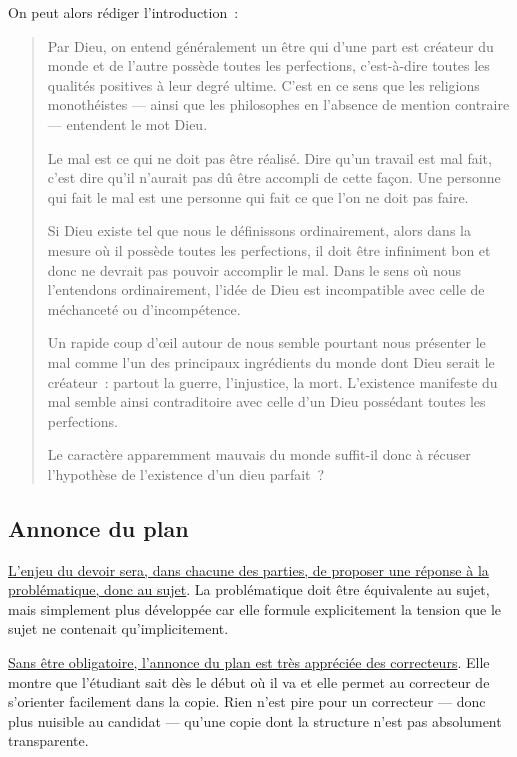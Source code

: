 \documentclass[a4paper,12pt]{article}
\begin{document}
\noindent On peut alors rédiger l'introduction :

\begin{quotation}
Par Dieu, on entend généralement un être qui
d'une part est créateur du monde et de l'autre possède toutes les
perfections, c'est-à-dire toutes les qualités positives à leur degré
ultime. C'est en ce sens que les religions monothéistes — ainsi que
les philosophes en l'absence de mention contraire — entendent le mot
Dieu.

Le mal est ce qui ne doit pas être réalisé. Dire qu'un travail est mal
fait, c'est dire qu'il n'aurait pas dû être accompli de cette façon.
Une personne qui fait le mal est une personne qui fait ce que l'on ne
doit pas faire. 

Si Dieu existe tel que nous le définissons
ordinairement, alors dans la mesure où il possède toutes les
perfections, il doit être infiniment bon et donc ne devrait pas
pouvoir accomplir le mal. Dans le sens où nous l'entendons
ordinairement, l'idée de Dieu est incompatible avec celle de
méchanceté ou d'incompétence.

Un rapide coup d'œil autour de nous semble
pourtant nous présenter le mal comme l'un des principaux ingrédients
du monde dont Dieu serait le créateur : partout la guerre,
l'injustice, la mort. L'existence manifeste du mal semble ainsi
contraditoire avec celle d'un Dieu possédant toutes les perfections.

Le caractère apparemment mauvais du monde
suffit-il donc à récuser l'hypothèse de l'existence d'un dieu
parfait ?
\end{quotation}



\subsection{Annonce du plan}
\label{sec:org8ffa604}
\label{orgd6bf00c}

\uline{L'enjeu du devoir sera, dans chacune des parties, de proposer une
réponse à la problématique, donc au sujet}. La problématique doit être
équivalente au sujet, mais simplement plus développée car elle formule
explicitement la tension que le sujet ne contenait qu'implicitement.


\uline{Sans être obligatoire, l'annonce du plan est très appréciée des
correcteurs}. Elle montre que l'étudiant sait dès le début où il va et
elle permet au correcteur de s'orienter facilement dans la copie. Rien
n'est pire pour un correcteur — donc plus nuisible au candidat — qu'une
copie dont la structure n'est pas absolument transparente.
\end{document}
